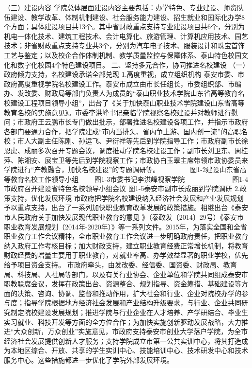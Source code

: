 （三）建设内容
学院总体层面建设内容主要包括：办学特色、专业建设、师资队伍建设、教学改革、体制机制建设、社会服务能力建设、招生就业和国际化办学8个方面；具体建设项目共13个。其中省财政重点支持专业建设项目共6个，分别为机电一体化技术、建筑工程技术、会计电算化、旅游管理、计算机应用技术、园艺技术；非省财政重点支持专业共3个，分别为汽车电子技术、服装设计和珠宝首饰工艺与鉴定；以及校企合作体制机制、教学质量监控与保障体系、泰山特色校园文化和数字化校园4个特色建设项目。
二、坚持多元合作，协同推进名校建设
（一）政府倾力支持，名校建设承诺全部兑现
1.高度重视，成立组织机构
泰安市委、市政府高度重视学院名校建设工作。泰安市成立由市长任组长，市委组织部、市编办、发改委、财政局等部门负责人为成员的“泰山职业技术学院山东省高等教育名校建设工程项目领导小组”，出台了《关于加快泰山职业技术学院建设山东省高等教育名校的实施意见》。市委李洪峰书记亲临学院视察名校建设并对教师进行慰问；市政府王云鹏市长专门做出批示，部署推进名校建设各项工作，并指示市政府各部门要通力合作，把学院建成“市内当排头、省内争上游、国内创一流”的高职名校；市人大副主任陈刚、孙运飞、尹衍祥等先后到学院指导工作；市政府副市长徐恩虎、成丽多次召开专题会议，调度推动学院名校建设工作；副市长刘卫东、周桂萍、陈湘安、展宝卫等先后到学院视察工作；市政协白玉翠主席带领市政协委员来学院进行“产教融合，加快名校建设”的专题调研等。　
　      　　
图1-2建设山东省高等教育名校工作领导小组　  　图1-3市委书记李洪峰视察学院
　　　　 
　　
图1-4市政府召开建设省特色名校领导小组会议  图1-5泰安市副市长成丽到学院调研
2.政策支持，优化发展环境
市政府把学院名校建设纳入经济社会发展和产业发展规划予以重点支持，出台了一系列加快职业教育改革发展的政策措施。相继出台《泰安市人民政府关于加快发展现代职业教育的意见 》（泰政发〔2014〕29号）《泰安市职业教育发展规划（2014年-2020年）》等一系列文件。2015年，为落实全国和全省职业教育工作会议精神，全市职业教育工作会议进一步明确政府责任，把职业教育纳入政府工作考核目标；加大财政支持，建立职业教育经费正常增长机制，将教育财政经费的增量主要用于职业教育，对就业率高、办学效益显著的职业学校，优先给予项目资金支持。
市政府牵头，由发改委、经信委、国资委、财政局、教育局、科技局、人社局等部门，以及有关行业协会、企业单位和学院共同组成泰安市职教联席会议，发挥在政策出台、资源整合、规划指导、资金筹措、基础建设等方面的决策、咨询、协调、监督和推动作用，扩大社会和行业、企业对院校办学的参与度；指导学院根据地方经济社会发展和产业结构升级要求，与行业、企业共同研究制定院校建设发展规划；推进学院与行业企业在人才培养、产学研结合、毕业生实习就业、科技开发等方面的全方位合作；为加快实施创新驱动发展战略，大力推进“大众创新，万众创业”实施意见，市政府支持泰安市创业大学落户学院，为全市经济社会发展提供创新人才服务；支持学院成立市第一公共实训中心，将其打造成为本地区综合、开放、共享的学生实训中心、技能培训中心、技术研发中心和技术服务中心。这些措施都进一步优化了学院外部发展环境。
